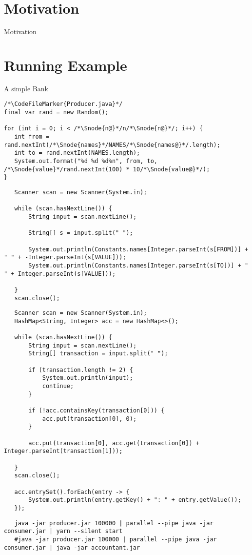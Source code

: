 


\section{Motivation}
\begin{frame}{Motivation}
\end{frame}
\section{Running Example}
\begin{frame}[fragile]{A simple Bank}
\begin{layout-imageonly}
\begin{verbatim}
/*\CodeFileMarker{Producer.java}*/
final var rand = new Random();

for (int i = 0; i < /*\Snode{n@}*/n/*\Snode{n@}*/; i++) {
   int from = rand.nextInt(/*\Snode{names}*/NAMES/*\Snode{names@}*/.length);
   int to = rand.nextInt(NAMES.length);
   System.out.format("%d %d %d%n", from, to, /*\Snode{value}*/rand.nextInt(100) * 10/*\Snode{value@}*/);
}
\end{verbatim}
\end{layout-imageonly}
\begin{verbatim}
   Scanner scan = new Scanner(System.in);

   while (scan.hasNextLine()) {
       String input = scan.nextLine();

       String[] s = input.split(" ");

       System.out.println(Constants.names[Integer.parseInt(s[FROM])] + " " + -Integer.parseInt(s[VALUE]));
       System.out.println(Constants.names[Integer.parseInt(s[TO])] + " " + Integer.parseInt(s[VALUE]));

   }
   scan.close();
\end{verbatim}
\begin{verbatim}
   Scanner scan = new Scanner(System.in);
   HashMap<String, Integer> acc = new HashMap<>();

   while (scan.hasNextLine()) {
       String input = scan.nextLine();
       String[] transaction = input.split(" ");

       if (transaction.length != 2) {
           System.out.println(input);
           continue;
       }

       if (!acc.containsKey(transaction[0])) {
           acc.put(transaction[0], 0);
       }

       acc.put(transaction[0], acc.get(transaction[0]) + Integer.parseInt(transaction[1]));

   }
   scan.close();

   acc.entrySet().forEach(entry -> {
       System.out.println(entry.getKey() + ": " + entry.getValue());
   });
\end{verbatim}
\begin{verbatim}
   java -jar producer.jar 100000 | parallel --pipe java -jar consumer.jar | yarn --silent start
   #java -jar producer.jar 100000 | parallel --pipe java -jar consumer.jar | java -jar accountant.jar
\end{verbatim}
\end{frame}

